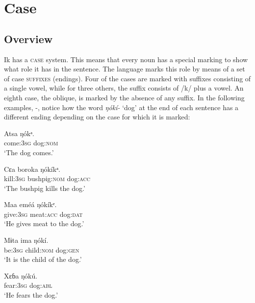\section{Case}\label{sec:7}



\subsection{Overview}\label{sec:7.1}


Ik has a \textsc{case} system. This means that every noun has a special marking to show what role it has in the sentence. The language marks this role by means of a set of case \textsc{suffixes} (endings). Four of the cases are marked with suffixes consisting of a single vowel, while for three others, the suffix consists of /k/ plus a vowel. An eighth case, the oblique, is marked by the absence of any suffix. In the following examples, -, notice how the word \textit{ŋókí-} ‘dog’ at the end of each sentence has a different ending depending on the case for which it is marked:



 
\ea\label{ex:case:1}
\gll Atsa     ŋókᵃ. \\ 
come:\textsc{3sg}   dog:\textsc{nom}    \\
\glt ‘The dog comes.’ 
\z


 
\ea\label{ex:case:2}
\gll Cɛa     boroka     ŋókíkᵃ. \\ 
kill:\textsc{3sg}   bushpig:\textsc{nom}   dog:\textsc{acc}    \\
\glt ‘The bushpig kills the dog.’ 
\z



 
\ea\label{ex:case:3}
\gll Maa     eméá     ŋókíkᵉ. \\ 
give:\textsc{3sg}   meat:\textsc{acc}   dog:\textsc{dat}    \\
\glt ‘He gives meat to the dog.’ 
\z



 
\ea\label{ex:case:4}
\gll Mɨta     ima     ŋókí. \\ 
be:\textsc{3sg}   child:\textsc{nom}   dog:\textsc{gen}    \\
\glt ‘It is the child of the dog.’ 
\z



 
\ea\label{ex:case:5}
\gll Xɛɓa     ŋókú. \\ 
fear:\textsc{3sg}   dog:\textsc{abl}    \\
\glt ‘He fears the dog.’ 
\z


